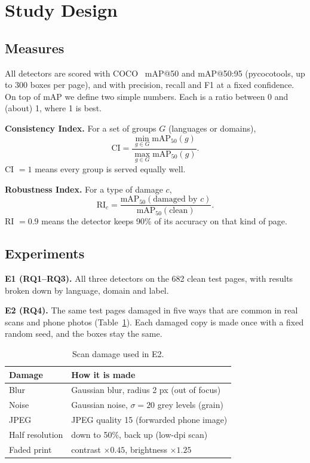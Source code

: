\documentclass[conference]{IEEEtran}
\begin{document}
\section{Study Design}
\subsection{Measures}
All detectors are scored with COCO~\cite{coco} mAP@50 and mAP@50:95 (pycocotools, up to 300 boxes per page), and with
precision, recall and F1 at a fixed confidence. On top of mAP we define two simple numbers. Each is a ratio
between 0 and (about) 1, where 1 is best.

\textbf{Consistency Index.} For a set of groups $G$ (languages or domains),
\begin{equation}
\mathrm{CI} = \frac{\min_{g \in G} \mathrm{mAP}_{50}(g)}{\max_{g \in G} \mathrm{mAP}_{50}(g)}.
\end{equation}
CI $=1$ means every group is served equally well.

\textbf{Robustness Index.} For a type of damage $c$,
\begin{equation}
\mathrm{RI}_c = \frac{\mathrm{mAP}_{50}(\text{damaged by } c)}{\mathrm{mAP}_{50}(\text{clean})}.
\end{equation}
RI $=0.9$ means the detector keeps 90\% of its accuracy on that kind of page.

\subsection{Experiments}
\textbf{E1 (RQ1--RQ3).} All three detectors on the 682 clean test pages, with results broken down by
language, domain and label.

\textbf{E2 (RQ4).} The same test pages damaged in five ways that are common in real scans and phone photos
(Table~\ref{tab:corr}). Each damaged copy is made once with a fixed random seed, and the boxes stay the same.

\begin{table}[t]
\centering
\caption{Scan damage used in E2.}
\label{tab:corr}
\small
\begin{tabular}{ll}
\toprule
Damage & How it is made \\
\midrule
Blur & Gaussian blur, radius 2 px (out of focus) \\
Noise & Gaussian noise, $\sigma = 20$ grey levels (grain) \\
JPEG & JPEG quality 15 (forwarded phone image) \\
Half resolution & down to 50\%, back up (low-dpi scan) \\
Faded print & contrast $\times 0.45$, brightness $\times 1.25$ \\
\bottomrule
\end{tabular}
\end{table}
\end{document}
